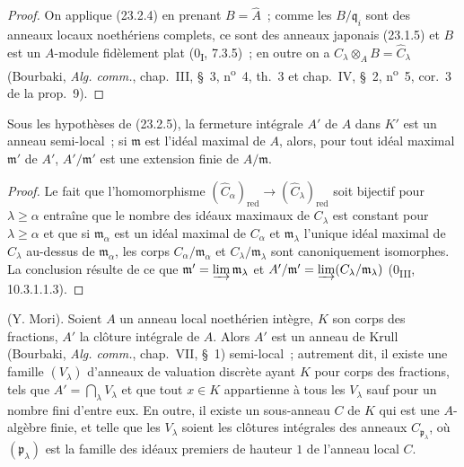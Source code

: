 
\begin{proof}
On applique (23.2.4) en prenant $B=\widehat A$~; comme les
$B/\mathfrak q_i$ sont des anneaux locaux noethériens complets, ce sont des
anneaux japonais (23.1.5) et $B$ est un $A$-module fidèlement plat
(0\textsubscript{I}, 7.3.5)~; en outre on a
$C_\lambda\otimes_AB=\widehat C_\lambda$ (Bourbaki, \emph{Alg. comm.},
chap.~III, §~3, n\textsuperscript{o}~4, th.~3 et chap.~IV, §~2,
n\textsuperscript{o}~5, cor.~3 de la prop.~9).
\end{proof}

\begin{corollary}[23.2.6]
\label{0.23.2.6-fr}
Sous les hypothèses de (23.2.5), la fermeture intégrale $A'$ de $A$ dans
$K'$ est un anneau semi-local~; si $\mathfrak m$ est l'idéal maximal de $A$,
alors, pour tout idéal maximal $\mathfrak m'$ de $A'$,
$A'/\mathfrak m'$ est une extension finie de $A/\mathfrak m$.
\end{corollary}

\begin{proof}
Le fait que l'homomorphisme
$(\widehat C_\alpha)_{\mathrm{red}}\to
(\widehat C_\lambda)_{\mathrm{red}}$ soit bijectif pour
$\lambda\geqslant\alpha$ entraîne que le nombre des idéaux maximaux de
$C_\lambda$ est constant pour $\lambda\geqslant\alpha$ et que si
$\mathfrak m_\alpha$ est un idéal maximal de $C_\alpha$ et
$\mathfrak m_\lambda$ l'unique idéal maximal de $C_\lambda$ au-dessus de
$\mathfrak m_\alpha$, les corps $C_\alpha/\mathfrak m_\alpha$ et
$C_\lambda/\mathfrak m_\lambda$ sont canoniquement isomorphes. La conclusion
résulte de ce que $\mathfrak m'=\varinjlim\mathfrak m_\lambda$ et
$A'/\mathfrak m'=\varinjlim(C_\lambda/\mathfrak m_\lambda)$
(0\textsubscript{III}, 10.3.1.1.3).
\end{proof}

\begin{proposition}[23.2.7]
\label{0.23.2.7-fr}
\textnormal{(Y. Mori).} Soient $A$ un anneau local noethérien intègre, $K$ son
corps des fractions, $A'$ la clôture intégrale de $A$. Alors $A'$ est un
anneau de Krull (Bourbaki, \emph{Alg. comm.}, chap.~VII, §~1) semi-local~;
autrement dit, il existe une famille $(V_\lambda)$ d'anneaux de valuation
discrète ayant $K$ pour corps des fractions, tels que
$A'=\bigcap_\lambda V_\lambda$ et que tout $x\in K$ appartienne à tous les
$V_\lambda$ sauf pour un nombre fini d'entre eux. En outre, il existe un
sous-anneau $C$ de $K$ qui est une $A$-algèbre finie, et telle que les
$V_\lambda$ soient les clôtures intégrales des anneaux
$C_{\mathfrak p_\lambda}$, où $(\mathfrak p_\lambda)$ est la famille des
idéaux premiers de hauteur $1$ de l'anneau local $C$.
\end{proposition}

